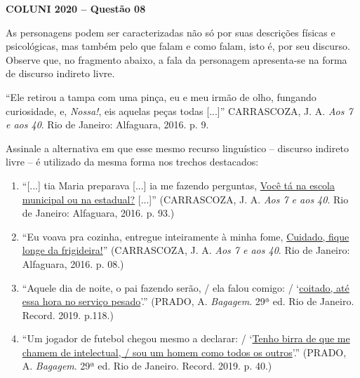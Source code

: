 \textbf{COLUNI 2020 -- Questão 08}\par\medskip As personagens podem ser caracterizadas não só por suas descrições físicas e psicológicas, mas também pelo que falam e como falam, isto é, por seu discurso. Observe que, no fragmento abaixo, a fala da personagem apresenta-se na forma de discurso indireto livre.

\par

“Ele retirou a tampa com uma pinça, eu e meu irmão de olho, fungando curiosidade, e, \textit{Nossa!}, eis aquelas peças todas [...]” CARRASCOZA, J. A. \textit{Aos 7 e aos 40}. Rio de Janeiro: Alfaguara, 2016. p. 9.

\par

Assinale a alternativa em que esse mesmo recurso linguístico – discurso indireto livre – é utilizado da mesma forma nos trechos destacados:\begin{enumerate}
\item “[...] tia Maria preparava [...] ia me fazendo perguntas, \underline{Você tá na escola municipal ou na estadual?} [...]”
     (CARRASCOZA, J. A. \textit{Aos 7 e aos 40}. Rio de Janeiro: Alfaguara, 2016. p. 93.)
\item “Eu voava pra cozinha, entregue inteiramente à minha fome, \underline{Cuidado, fique longe da frigideira!}”
     (CARRASCOZA, J. A. \textit{Aos 7 e aos 40}. Rio de Janeiro: Alfaguara, 2016. p. 08.)
\item “Aquele dia de noite, o pai fazendo serão, / ela falou comigo: / ‘\underline{coitado, até essa hora no serviço pesado}’.”
     (PRADO, A. \textit{Bagagem}. 29ª ed. Rio de Janeiro. Record. 2019. p.118.)
\item “Um jogador de futebol chegou mesmo a declarar: / ‘\underline{Tenho birra de que me chamem de intelectual, / sou
      um homem como todos os outros}’.” (PRADO, A. \textit{Bagagem}. 29ª ed. Rio de Janeiro. Record. 2019. p. 40.)\end{enumerate}
